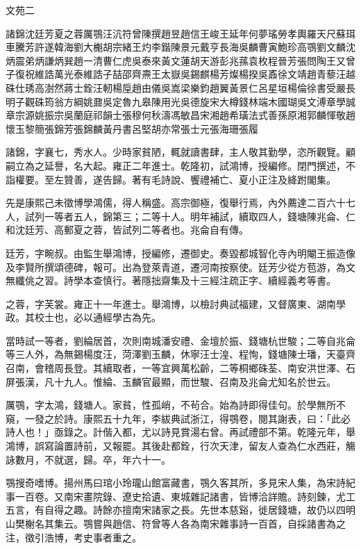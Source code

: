 
\begin{pinyinscope}
文苑二

諸錦沈廷芳夏之蓉厲鶚汪沆符曾陳撰趙昱趙信王峻王延年何夢瑤勞孝輿羅天尺蘇珥車騰芳許遂韓海劉大櫆胡宗緒王灼李鍇陳景元戴亨長海吳麟曹寅鮑珍高鶚劉文麟沈炳震弟炳謙炳巽趙一清曹仁虎吳泰來黃文蓮胡天游彭兆蓀袁枚程晉芳張問陶王又曾子復祝維誥萬光泰維誥子喆邵齊燾王太嶽吳錫麒楊芳燦楊揆吳鼒徐文靖趙青藜汪越硃仕琇高澍然蔣士銓汪軔楊垕趙由儀吳嵩梁樂鈞趙翼黃景仁呂星垣楊倫徐書受嚴長明子觀硃筠翁方綱姚鼐吳定魯九皋陳用光吳德旋宋大樽錢林端木國瑚吳文溥章學誠章宗源姚振宗吳蘭庭祁韻士張穆何秋濤馮敏昌宋湘趙希璜法式善孫原湘郭麟惲敬趙懷玉黎簡張錦芳張錦麟黃丹書呂堅胡亦常張士元張海珊張履

諸錦，字襄七，秀水人。少時家貧陋，輒就讀書肆，主人敬其勤學，恣所觀覽。顧嗣立為之延譽，名大起。雍正二年進士。乾隆初，試鴻博，授編修。閉門撰述，不詣權要。至左贊善，遂告歸。著有毛詩說、饗禮補亡、夏小正注及絳跗閣集。

先是康熙己未徵博學鴻儒，得人稱盛。高宗御極，復舉行焉，內外薦達二百六十七人，試列一等者五人，錦第三；二等十人。明年補試，續取四人，錢塘陳兆侖、仁和沈廷芳、高郵夏之蓉，皆試列二等者也。兆侖自有傳。

廷芳，字畹叔。由監生舉鴻博，授編修，遷御史。奏毀都城智化寺內明閹王振造像及李賢所撰頌德碑，報可。出為登萊青道，遷河南按察使。廷芳少從方苞游，為文無纖佻之習。詩學本查慎行。著隱拙齋集及十三經注疏正字、續經義考等書。

之蓉，字芙裳。雍正十一年進士。舉鴻博，以檢討典試福建，又督廣東、湖南學政。其校士也，必以通經學古為先。

當時試一等者，劉綸居首，次則南城潘安禮、金壇於振、錢塘杭世駿；二等自兆侖等三人外，為無錫楊度汪，菏澤劉玉麟，休寧汪士湟、程恂，錢塘陳士璠，天臺齊召南，會稽周長登。其續取者，一等宜興萬松齡，二等桐鄉硃荃、南安洪世澤、石屏張漢，凡十九人。惟綸、玉麟官最顯，而世駿、召南及兆侖尤知名於世云。

厲鶚，字太鴻，錢塘人。家貧，性孤峭，不茍合。始為詩即得佳句。於學無所不窺，一發之於詩。康熙五十九年，李紱典試浙江，得鶚卷，閱其謝表，曰：「此必詩人也！」亟錄之。計偕入都，尤以詩見賞湯右曾。再試禮部不第。乾隆元年，舉鴻博，誤寫論置詩前，又報罷。其後赴都銓，行次天津，留友人查為仁水西莊，觴詠數月，不就選，歸。卒，年六十一。

鶚搜奇嗜博。揚州馬曰琯小玲瓏山館富藏書，鶚久客其所，多見宋人集，為宋詩紀事一百卷。又南宋畫院錄、遼史拾遺、東城雜記諸書，皆博洽詳贍。詩刻鍊，尤工五言，有自得之趣。詩餘亦擅南宋諸家之長。先世本慈谿，徙居錢塘，故仍以四明山樊榭名其集云。鶚嘗與趙信、符曾等人各為南宋雜事詩一百首，自採諸書為之注，徵引浩博，考史事者重之。


\end{pinyinscope}
